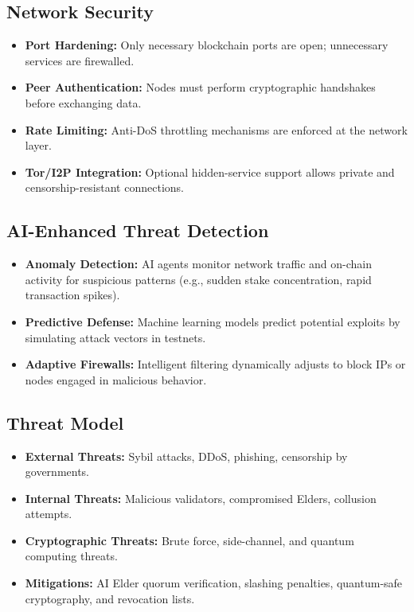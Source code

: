 \documentclass[11pt,a4paper]{article}
\begin{document}
\subsection{Network Security}
\begin{itemize}
    \item \textbf{Port Hardening:} Only necessary blockchain ports are open; unnecessary services are firewalled.  
    \item \textbf{Peer Authentication:} Nodes must perform cryptographic handshakes before exchanging data.  
    \item \textbf{Rate Limiting:} Anti-DoS throttling mechanisms are enforced at the network layer.  
    \item \textbf{Tor/I2P Integration:} Optional hidden-service support allows private and censorship-resistant connections.  
\end{itemize}

\subsection{AI-Enhanced Threat Detection}
\begin{itemize}
    \item \textbf{Anomaly Detection:} AI agents monitor network traffic and on-chain activity for suspicious patterns (e.g., sudden stake concentration, rapid transaction spikes).  
    \item \textbf{Predictive Defense:} Machine learning models predict potential exploits by simulating attack vectors in testnets.  
    \item \textbf{Adaptive Firewalls:} Intelligent filtering dynamically adjusts to block IPs or nodes engaged in malicious behavior.  
\end{itemize}

\subsection{Threat Model}
\begin{itemize}
    \item \textbf{External Threats:} Sybil attacks, DDoS, phishing, censorship by governments.  
    \item \textbf{Internal Threats:} Malicious validators, compromised Elders, collusion attempts.  
    \item \textbf{Cryptographic Threats:} Brute force, side-channel, and quantum computing threats.  
    \item \textbf{Mitigations:} AI Elder quorum verification, slashing penalties, quantum-safe cryptography, and revocation lists.  
\end{itemize}
\end{document}
